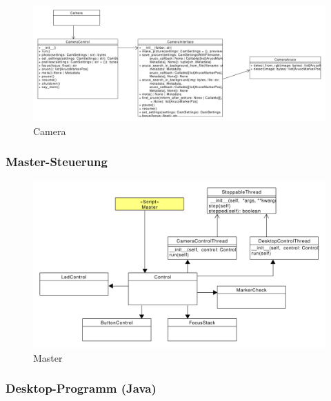 \documentclass[./00PhotoBox.tex]{subfiles}
\begin{document}
\begin{figure}
    \centering
    \includegraphics[width=1\textwidth]{./img/uml/uml_camera_classdiagramm.pdf}
    \centering
    \caption{Camera} %
    \label{img:uml_camera} %
\end{figure}

\subsubsection{Master-Steuerung}
\begin{figure}
    \centering
    \includegraphics[width=1\textwidth]{./img/uml/uml_master_classdiagramm.pdf}
    \centering
    \caption{Master} %
    \label{img:master} %
\end{figure}

\subsubsection{Desktop-Programm (Java)}
\end{document}
